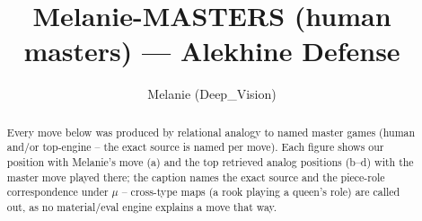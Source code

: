 \documentclass[11pt]{article}
\title{Melanie-MASTERS (human masters) — Alekhine Defense}
\author{Melanie (Deep\_Vision)}
\date{}
\begin{document}
\maketitle

\begin{abstract}Every move below was produced by relational analogy to named master games (human and/or top-engine -- the exact source is named per move). Each figure shows our position with Melanie's move (a) and the top retrieved analog positions (b--d) with the master move played there; the caption names the exact source and the piece-role correspondence under $\mu$ -- cross-type maps (a rook playing a queen's role) are called out, as no material/eval engine explains a move that way.\end{abstract}

\begin{figure}[p]\centering
\begin{subfigure}{0.46\textwidth}\centering
\resizebox{\linewidth}{!}{%
\newchessgame
\chessboard[
  setfen={rnbqk2r/ppp1ppbp/1n1p2p1/4P1N1/3P4/1B6/PPP2PPP/RNBQK2R b KQkq - 5 7},
  showmover=false,
  pgfstyle=straightmove, color=movearrow, markmove={d6-d5}
]}
\caption{}
\end{subfigure}\hfill
\begin{subfigure}{0.46\textwidth}\centering
\resizebox{\linewidth}{!}{%
\newchessgame
\chessboard[
  setfen={r2qkb1r/pp1n2pp/4bp2/1Np1p3/P2pPP2/6Q1/1P1PB1PP/R1B1K2R b KQkq - 1 13},
  showmover=false,
  pgfstyle=straightmove, color=movearrow, markmove={e5-f4}
]}
\caption{}
\end{subfigure}
\\[4pt]
\begin{subfigure}{0.46\textwidth}\centering
\resizebox{\linewidth}{!}{%
\newchessgame
\chessboard[
  setfen={2bq1k1r/p3ppbp/1pB2np1/2p5/N2p1P2/3PB1PP/PPP1P3/R2Q1RK1 b - - 0 13},
  showmover=false,
  pgfstyle=straightmove, color=movearrow, markmove={d4-e3}
]}
\caption{}
\end{subfigure}\hfill
\begin{subfigure}{0.46\textwidth}\centering
\resizebox{\linewidth}{!}{%
\newchessgame
\chessboard[
  setfen={rnbq1rk1/p3ppb1/2pp1nN1/6Np/1p1P3P/3BB3/PPP2PP1/R2QK2R b KQ - 0 12},
  showmover=false,
  pgfstyle=straightmove, color=movearrow, markmove={f7-g6}
]}
\caption{}
\end{subfigure}

\end{figure}
\end{document}

